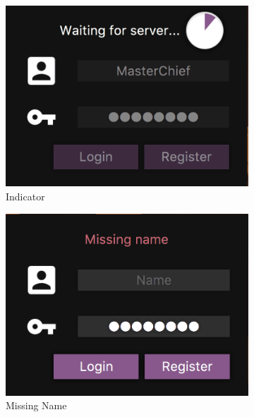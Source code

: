 \documentclass[12pt, titlepage]{scrartcl}
\begin{document}
			    \begin{figure}[H]
                    \centering
                    \begin{subfigure}[h]{0.3\linewidth}
                        \includegraphics[width=\linewidth]{images/old_state/login/Indicator.png}
                        \caption{Indicator}
                    \end{subfigure}
                    \begin{subfigure}[h]{0.3\linewidth}
                        \includegraphics[width=\linewidth]{images/old_state/login/MissingName.png}
                        \caption{Missing Name}
                    \end{subfigure}
                    \begin{subfigure}[h]{0.3\linewidth}

\end{subfigure}
\end{figure}
\end{document}
